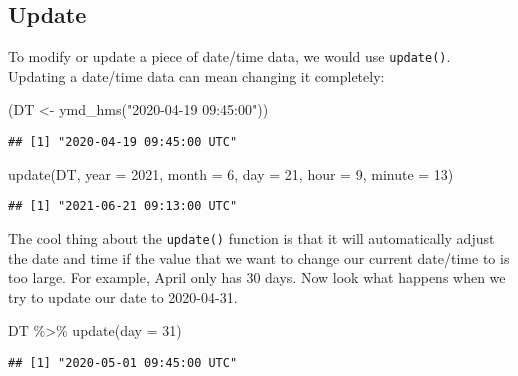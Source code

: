 \documentclass[
]{book}
\newenvironment{Shaded}{\begin{snugshade}}{\end{snugshade}}
\newcommand{\AttributeTok}[1]{\textcolor[rgb]{0.77,0.63,0.00}{#1}}
\newcommand{\DecValTok}[1]{\textcolor[rgb]{0.00,0.00,0.81}{#1}}
\newcommand{\FunctionTok}[1]{\textcolor[rgb]{0.00,0.00,0.00}{#1}}
\newcommand{\NormalTok}[1]{#1}
\newcommand{\OtherTok}[1]{\textcolor[rgb]{0.56,0.35,0.01}{#1}}
\newcommand{\SpecialCharTok}[1]{\textcolor[rgb]{0.00,0.00,0.00}{#1}}
\newcommand{\StringTok}[1]{\textcolor[rgb]{0.31,0.60,0.02}{#1}}
\begin{document}
\hypertarget{update}{%
\subsection{Update}\label{update}}

To modify or update a piece of date/time data, we would use \texttt{update()}. Updating a date/time data can mean changing it completely:

\begin{Shaded}
\begin{Highlighting}[]
\NormalTok{(DT }\OtherTok{\textless{}{-}} \FunctionTok{ymd\_hms}\NormalTok{(}\StringTok{"2020{-}04{-}19 09:45:00"}\NormalTok{))}
\end{Highlighting}
\end{Shaded}

\begin{verbatim}
## [1] "2020-04-19 09:45:00 UTC"
\end{verbatim}

\begin{Shaded}
\begin{Highlighting}[]
\FunctionTok{update}\NormalTok{(DT, }\AttributeTok{year =} \DecValTok{2021}\NormalTok{, }\AttributeTok{month =} \DecValTok{6}\NormalTok{, }\AttributeTok{day =} \DecValTok{21}\NormalTok{, }\AttributeTok{hour =} \DecValTok{9}\NormalTok{, }\AttributeTok{minute =} \DecValTok{13}\NormalTok{)}
\end{Highlighting}
\end{Shaded}

\begin{verbatim}
## [1] "2021-06-21 09:13:00 UTC"
\end{verbatim}

The cool thing about the \texttt{update()} function is that it will automatically adjust the date and time if the value that we want to change our current date/time to is too large. For example, April only has 30 days. Now look what happens when we try to update our date to 2020-04-31.

\begin{Shaded}
\begin{Highlighting}[]
\NormalTok{DT }\SpecialCharTok{\%\textgreater{}\%}
    \FunctionTok{update}\NormalTok{(}\AttributeTok{day =} \DecValTok{31}\NormalTok{)}
\end{Highlighting}
\end{Shaded}

\begin{verbatim}
## [1] "2020-05-01 09:45:00 UTC"
\end{verbatim}
\end{document}
